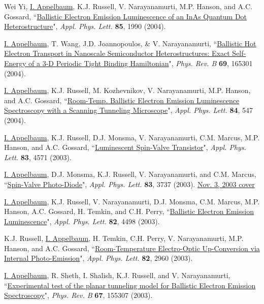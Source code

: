 \documentclass[paper=letter,fontsize=11pt]{scrartcl} %
\newcommand{\PaperEntry}[7]{
		\noindent #1, ``\href{#7}{#2}", \textit{#3} \textbf{#4}, #5 (#6).}
\begin{document}
\begin{etaremune}
\item\PaperEntry{Wei Yi, \underline{I. Appelbaum}, K.J. Russell, V. Narayanamurti, M.P. Hanson, and A.C. Gossard}{Ballistic Electron Emission Luminescence of an InAs Quantum Dot Heterostructure}{Appl. Phys. Lett.}{85}{1990}{2004}{http://dx.doi.org/10.1063/1.1790595}

\item\PaperEntry{\underline{I. Appelbaum}, T. Wang, J.D. Joannopoulos, \& V. Narayanamurti}{Ballistic Hot Electron Transport in Nanoscale Semiconductor Heterostructures: Exact Self-Energy of a 3-D Periodic Tight Binding Hamiltonian}{Phys. Rev. B}{69}{165301}{2004}{http://dx.doi.org/10.1103/PhysRevB.69.165301} 

\item\PaperEntry{\underline{I. Appelbaum}, K.J. Russell, M. Kozhevnikov, V. Narayanamurti, M.P. Hanson, and A.C. Gossard}{Room-Temp. Ballistic Electron Emission Luminescence Spectroscopy with a Scanning Tunneling Microscope}{Appl. Phys. Lett.}{84}{547}{2004}{http://dx.doi.org/10.1063/1.1644329}

\item\PaperEntry{\underline{I. Appelbaum}, K.J. Russell, D.J. Monsma, V. Narayanamurti, C.M. Marcus, M.P. Hanson, and A.C. Gossard}{Luminescent Spin-Valve Transistor}{Appl. Phys. Lett.}{83}{4571}{2003}{http://link.aip.org/link/doi/10.1063/1.1630838}

\item\PaperEntry{\underline{I. Appelbaum}, D.J. Monsma, K.J. Russell, V. Narayanamurti, and C.M. Marcus}{Spin-Valve Photo-Diode}{Appl. Phys. Lett.}{83}{3737}{2003}{http://dx.doi.org/10.1063/1.1623315} \href{http://scitation.aip.org/apl/covers/83_18.jsp}{Nov. 3, 2003 cover} 

\item\PaperEntry{\underline{I. Appelbaum}, K.J. Russell, V. Narayanamurti, D.J. Monsma, C.M. Marcus, M.P. Hanson, A.C. Gossard, H. Temkin, and C.H. Perry}{Ballistic Electron Emission Luminescence}{Appl. Phys. Lett.}{82}{4498}{2003}{http://dx.doi.org/10.1063/1.1584524} 

\item\PaperEntry{K.J. Russell, \underline{I. Appelbaum}, H. Temkin, C.H. Perry, V. Narayanamurti, M.P. Hanson, and A.C. Gossard}{Room-Temperature Electro-Optic Up-Conversion via Internal Photo-Emission}{Appl. Phys. Lett.}{82}{2960}{2003}{http://link.aip.org/link/doi/10.1063/1.1571981}

\item\PaperEntry{\underline{I. Appelbaum}, R. Sheth, I. Shalish, K.J. Russell, and V. Narayanamurti}{Experimental test of the planar tunneling model for Ballistic Electron Emission Spectroscopy}{Phys. Rev. B}{67}{155307}{2003}{http://dx.doi.org/10.1103/PhysRevB.67.155307} 


\end{etaremune}
\end{document}
